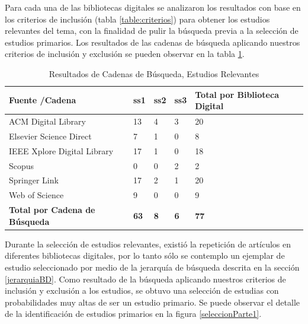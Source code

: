 \documentclass{report}
\begin{document}
            Para cada una de las bibliotecas digitales se analizaron los resultados con base en los criterios de inclusión (tabla \ref{table:criterios}) para obtener los estudios relevantes del tema, con la finalidad de pulir la búsqueda previa a la selección de estudios primarios. Los resultados de las cadenas de búsqueda aplicando nuestros criterios de inclusión y exclusión se pueden observar en la tabla \ref{table:ResultsSearchStringOutStandingStudies}.
            \begin{table}
                \begin{center}
                \caption{Resultados de Cadenas de Búsqueda, Estudios Relevantes}
                \label{table:ResultsSearchStringOutStandingStudies}
                    \begin{tabular}{| p{6cm} | p{1cm} | p{1cm} | p{1cm} | p{4cm} |}
                        \toprule
                        \hline
                        \textbf{Fuente /Cadena} & \textbf{ss1} & \textbf{ss2} & \textbf{ss3} & \textbf{Total por Biblioteca Digital}\\ \hline
                        ACM Digital Library & 13 & 4 & 3 & 20 \\ \hline
                        Elsevier Science Direct & 7 & 1 & 0 & 8\\ \hline
                        IEEE Xplore Digital Library & 17 & 1 & 0 & 18\\ \hline
                        Scopus & 0 & 0 & 2 & 2\\ \hline
                        Springer Link & 17 & 2 & 1 &  20\\ \hline
                        Web of Science & 9 & 0 & 0 & 9 \\ \hline
                        \textbf{Total por Cadena de Búsqueda} & \textbf{63} & \textbf{8} & \textbf{6} & \textbf{77}\\ \hline
                    \end{tabular}
                \end{center}
            \end{table}
            Durante la selección de estudios relevantes, existió la repetición de artículos en diferentes bibliotecas digitales, por lo tanto sólo se contemplo un ejemplar de estudio seleccionado por medio de la jerarquía de búsqueda descrita en la sección \ref{jerarquiaBD}. Como resultado de la búsqueda aplicando nuestros criterios de inclusión y exclusión a los estudios, se obtuvo una selección de estudias con probabilidades muy altas de ser un estudio primario. Se puede observar el detalle de la identificación de estudios primarios en la figura \ref{seleccionParte1}.\\            
\end{document}
